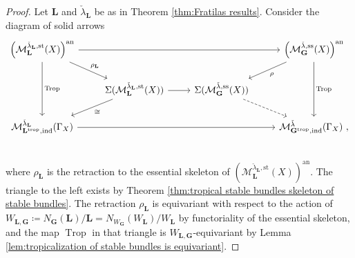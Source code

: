 \documentclass[10pt, a4paper]{amsart}
\theoremstyle{definition}
\theoremstyle{myitemstyle}
\newcommand{\lambdacheck}{\check{\lambda}}
\newcommand{\bfG}{\mathbf{G}}
\newcommand{\bfL}{\mathbf{L}}
\newcommand{\mc}[1]{{\mathcal{#1}}}
\DeclareMathOperator{\Trop}{Trop}
\newcommand{\an}{\mathrm{an}}
\newcommand{\st}{\mathrm{st}}
\newcommand{\semist}{\mathrm{ss}}
\newcommand{\ind}{\mathrm{ind}}
\newcommand{\trop}{{\mathrm{trop}}}
\newcommand{\Ga}{\Gamma}
\begin{document}
\begin{proof}
Let $\mathbf{L}$ and $\lambdacheck_{\mathbf{L}}$ be as in Theorem \ref{thm:Fratilas results}. Consider the diagram of solid arrows
\[
\begin{tikzcd}
    \left(\mc M_{\mathbf{L}}^{\lambdacheck_{\mathbf{L}},\st}(X)\right)^\an \arrow[dr,"\rho_{\mathbf{L}}"]\arrow[dd,"\Trop"]\arrow[rrr]&
        &
            &
                \left(\mc M_{\mathbf{G}}^{\lambdacheck,\semist}(X)\right)^\an\arrow[dl,"\rho"]\arrow[dd,"\Trop"]\\    
    &
        \Sigma(\mc M_{\mathbf{L}}^{\lambdacheck_{\mathbf{L}},\st}(X))\arrow[r]\arrow[dl,"\cong"] &
            \Sigma(\mc M_{\mathbf{G}}^{\lambdacheck,\semist}(X)) \arrow[dr,dashed] &
                \\
    \mc M_{\mathbf{L}^\trop,\ind}^{\lambdacheck_{\mathbf{L}}}(\Ga_X) \arrow[rrr]&
        &
            &
                \mc M_{\mathbf{G}^\trop,\ind}^{\lambdacheck}(\Ga_X) \ ,\\
\end{tikzcd}
\]
where $\rho_{\mathbf{L}}$ is the retraction to the essential skeleton of $\left(\mc M_{\mathbf{L}}^{\lambdacheck_\mathbf{L},\st}(X)\right)^\an $. The triangle to the left exists by Theorem \ref{thm:tropical stable bundles skeleton of stable bundles}. The retraction $\rho_{\mathbf{L}}$ is equivariant with respect to the action of $W_{\bfL,\bfG}\coloneqq N_\bfG(\bfL)/\bfL=N_{W_\bfG}(W_\bfL)/W_\bfL$  by functoriality of the essential skeleton, and the map $\Trop$ in that triangle is $W_{\mathbf{L},\mathbf{G}}$-equivariant by Lemma \ref{lem:tropicalization of stable bundles is equivariant}. 



\end{proof}
\end{document}
